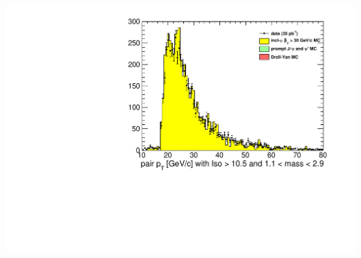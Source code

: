 \documentclass[compress]{beamer}
\begin{document}
\begin{frame}
\begin{columns}
\includegraphics[width=\linewidth]{lowdimuon_pt_midmass_noniso.pdf}
\end{columns}
\end{frame}
\end{document}
